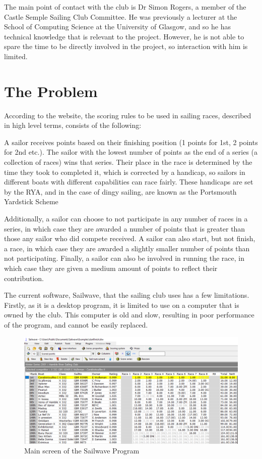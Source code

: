 \documentclass{l4proj}
\begin{document}
The main point of contact with the club is Dr Simon Rogers, a member of the Castle Semple Sailing Club Committee. He was previously a lecturer at the School of Computing Science at the University of Glasgow, and so he has technical knowledge that is relevant to the project. However, he is not able to spare the time to be directly involved in the project, so interaction with him is limited.

\section{The Problem}
According to the \citet{RYAscore} website, the scoring rules to be used in sailing races, described in high level terms, consists of the following:

A sailor receives points based on their finishing position (1 points for 1st, 2 points for 2nd etc.). The sailor with the lowest number of points as the end of a series (a collection of races) wins that series. Their place in the race is determined by the time they took to completed it, which is corrected by a handicap, so sailors in different boats with different capabilities can race fairly. These handicaps are set by the RYA, and in the case of dingy sailing, are known as the Portsmouth Yardstick Scheme
\citep{RYApy}

Additionally, a sailor can choose to not participate in any number of races in a series, in which case they are awarded a number of points that is greater than those any sailor who did compete received. A sailor can also start, but not finish, a race, in which case they are awarded a slightly smaller number of points than not participating. Finally, a sailor can also be involved in running the race, in which case they are given a medium amount of points to reflect their contribution.

The current software, Sailwave, that the sailing club uses has a few limitations. Firstly, as it is a desktop program, it is limited to use on a computer that is owned by the club. This computer is old and slow, resulting in poor performance of the program, and cannot be easily replaced.

\begin{figure}[h!]
    \centering
    \includegraphics[width=0.6\linewidth]{images/Sailwave.png} 

    \caption{Main screen of the Sailwave Program \citep{sailwave}
    }

    \label{fig:Sailwave} 
\end{figure}
\end{document}
